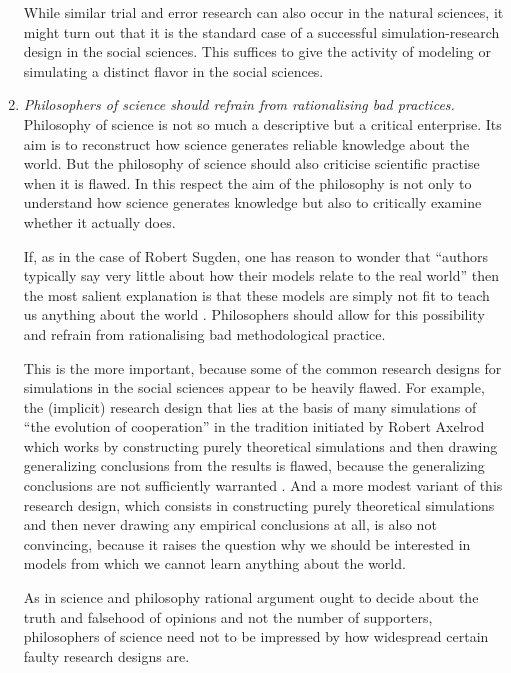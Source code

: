 \documentclass[onecollarge]{STJour}
\numberwithin{equation}{section}
\begin{document}
\begin{enumerate}
  While similar trial and error research can also occur in the natural
  sciences, it might turn out that it is the standard case of a
  successful simulation-research design in the social sciences. This
  suffices to give the activity of modeling or simulating a distinct
  flavor in the social sciences.
  
  \item {\em Philosophers of science should refrain from rationalising
  bad practices.} Philosophy of science is not so much a descriptive but a
  critical enterprise. Its aim is to reconstruct how science generates
  reliable knowledge about the world. But the philosophy of science
  should also criticise scientific practise when it is flawed. In this
  respect the aim of the philosophy is not only to understand how science
  generates knowledge but also to critically examine whether it
  actually does.
  
  If, as in the case of Robert Sugden, one has reason to wonder that
  ``authors typically say very little about how their models relate to
  the real world'' \citep[p.\ 25]{sugden:2009} then the most salient
  explanation is that these models are simply not fit to teach us
  anything about the world \citep[p.\ 48ff.]{cartwright:2009}.
  Philosophers should allow for this possibility and refrain from
  rationalising bad methodological practice.
  
  This is the more important, because some of the common research designs
  for simulations in the social sciences appear to be heavily flawed. For
  example, the (implicit) research design that lies at the basis of many
  simulations of ``the evolution of cooperation'' in the tradition
  initiated by Robert Axelrod \citep{axelrod:1984} which works by
  constructing purely theoretical simulations and then drawing
  generalizing conclusions from the results is flawed, because the
  generalizing conclusions are not sufficiently warranted 
  \citep[p.\ 313-319]{binmore:1998}. And a more modest variant of this
  research design, which consists in constructing purely theoretical simulations
  and then never drawing any empirical conclusions at all, is also
  not convincing, because it raises the question why we should be
  interested in models from which we cannot learn anything about the world.
  
  As in science and philosophy rational argument ought to decide about
  the truth and falsehood of opinions and not the number of supporters,
  philosophers of science need not to be impressed by how widespread
  certain faulty research designs are.

\end{enumerate}
\end{document}
